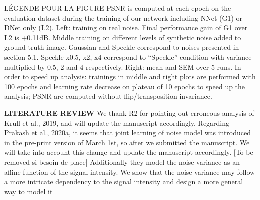 \documentclass{article}
\begin{document}
LÉGENDE POUR LA FIGURE
PSNR is computed at each epoch on the evaluation dataset during the training of our network including NNet (G1) or DNet only (L2). Left: training on real noise. Final performance gain of G1 over L2 is +0.11dB. Middle training on different levels of synthetic noise added to ground truth image. Gaussian and Speckle correspond to noises presented in section 5.1. Speckle x0.5, x2, x4 correspond to “Speckle” condition with variance multiplied by 0.5, 2 and 4 respectively. Right: mean and SEM over 5 runs. In order to speed up analysis: trainings in middle and right plots are performed with 100 epochs and learning rate decrease on plateau of 10 epochs to speed up the analysis; PSNR are computed without flip/transposition invariance.

\textbf{LITERATURE REVIEW}
We thank R2 for pointing out erroneous analysis of Krull et al., 2019, and will update the manuscript accordingly.
Regarding Prakash et al., 2020a, it seems that joint learning of noise model was introduced in the pre-print version of March 1st, so after we submitted the manuscript. We will take into account this change and update the manuscript accordingly.
[To be removed si besoin de place] Additionally they model the noise variance as an affine function of the signal intensity. We show that the noise variance may follow a more intricate dependency to the signal intensity and design a more general way to model it
\end{document}
